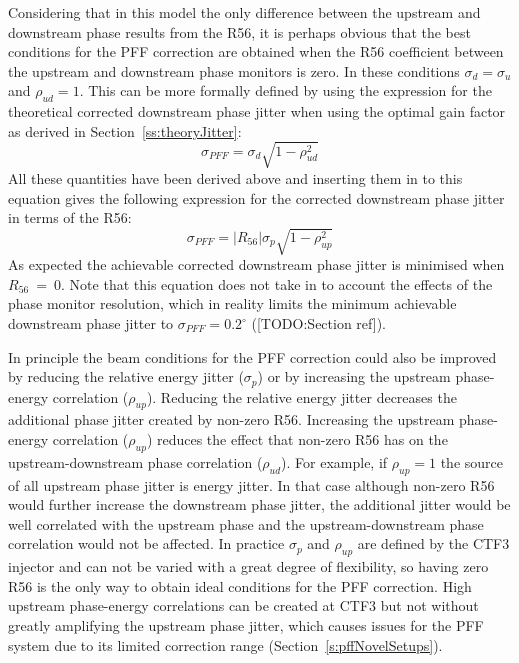 Considering that in this model the only difference between the upstream and downstream phase results from the R56, it is perhaps obvious that the best conditions for the PFF correction are obtained when the R56 coefficient between the upstream and downstream phase monitors is zero. In these conditions \(\sigma_d = \sigma_u\) and \(\rho_{ud} = 1\). This can be more formally defined by using the expression for the theoretical corrected downstream phase jitter when using the optimal gain factor as derived in Section~\ref{ss:theoryJitter}:
\begin{equation}
\sigma_{PFF} = \sigma_d\sqrt{1-\rho_{ud}^2}
\end{equation}
All these quantities have been derived above and inserting them in to this equation gives the following expression for the corrected downstream phase jitter in terms of the R56:
\begin{equation}
\sigma_{PFF} = \left|R_{56}\right|\sigma_p\sqrt{1-\rho_{up}^2}
\label{e:r56PFFJit}
\end{equation}
As expected the achievable corrected downstream phase jitter is minimised when \(R_{56}~=~0\). Note that this equation does not take in to account the effects of the phase monitor resolution, which in reality limits the minimum achievable downstream phase jitter to \(\sigma_{PFF}=0.2^\circ\) ([TODO:Section ref]). 

In principle the beam conditions for the PFF correction could also be improved by reducing the relative energy jitter (\(\sigma_p\)) or by increasing the upstream phase-energy correlation (\(\rho_{up}\)). Reducing the relative energy jitter decreases the additional phase jitter created by non-zero R56. Increasing the upstream phase-energy correlation (\(\rho_{up}\)) reduces the effect that non-zero R56 has on the upstream-downstream phase correlation (\(\rho_{ud}\)). For example, if \(\rho_{up}=1\) the source of all upstream phase jitter is energy jitter. In that case although non-zero R56 would further increase the downstream phase jitter, the additional jitter would be well correlated with the upstream phase and the upstream-downstream phase correlation would not be affected. In practice \(\sigma_p\) and \(\rho_{up}\) are defined by the CTF3 injector and can not be varied with a great degree of flexibility, so having zero R56 is the only way to obtain ideal conditions for the PFF correction. High upstream phase-energy correlations can be created at CTF3 but not without greatly amplifying the upstream phase jitter, which causes issues for the PFF system due to its limited correction range (Section~\ref{s:pffNovelSetups}).


